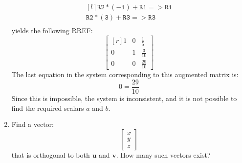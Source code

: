 \documentclass[12pt]{article}
\begin{document}
\begin{enumerate}
\[\begin{matrix*}[l]
\mathtt{R2*(-1)+R1=>R1}\\
\mathtt{R2*(3)+R3=>R3}\\
\end{matrix*}
\]
yields the following RREF:
\[
\left[\begin{matrix*}[r]1 & 0 & \frac{1}{5}\\0 & 1 & \frac{3}{10}\\0 & 0 & \frac{29}{10}\end{matrix*}\right]
\]
The last equation in the system corresponding to this augmented matrix is:
\[
0=\frac{29}{10}
\]
Since this is impossible, the system is inconsistent, and it is not possible to find the required scalars $a$ and $b$.
\proofend
\item Find a vector:
\[
\begin{bmatrix}x\\y\\z\end{bmatrix}
\]
that is orthogonal to both $\mathbf{u}$ and $\mathbf{v}$. How many such vectors exist?


\end{enumerate}
\end{document}

